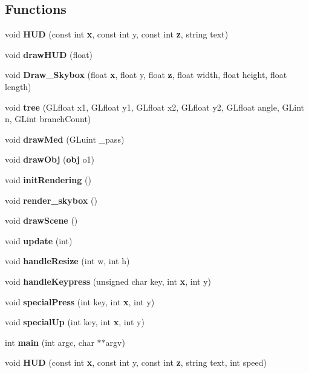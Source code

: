 \subsection*{Functions}
\begin{DoxyCompactItemize}
\item 
void {\bf H\-U\-D} (const int {\bf x}, const int y, const int {\bf z}, string text)
\item 
void {\bf draw\-H\-U\-D} (float)
\item 
void {\bf Draw\-\_\-\-Skybox} (float {\bf x}, float y, float {\bf z}, float width, float height, float length)
\item 
void {\bf tree} (G\-Lfloat x1, G\-Lfloat y1, G\-Lfloat x2, G\-Lfloat y2, G\-Lfloat angle, G\-Lint n, G\-Lint branch\-Count)
\item 
void {\bf draw\-Med} (G\-Luint \-\_\-pass)
\item 
void {\bf draw\-Obj} ({\bf obj} o1)
\item 
void {\bf init\-Rendering} ()
\item 
void {\bf render\-\_\-skybox} ()
\item 
void {\bf draw\-Scene} ()
\item 
void {\bf update} (int)
\item 
void {\bf handle\-Resize} (int w, int h)
\item 
void {\bf handle\-Keypress} (unsigned char key, int {\bf x}, int y)
\item 
void {\bf special\-Press} (int key, int {\bf x}, int y)
\item 
void {\bf special\-Up} (int key, int {\bf x}, int y)
\item 
int {\bf main} (int argc, char $\ast$$\ast$argv)
\item 
void {\bf H\-U\-D} (const int {\bf x}, const int y, const int {\bf z}, string text, int speed)
\end{DoxyCompactItemize}
